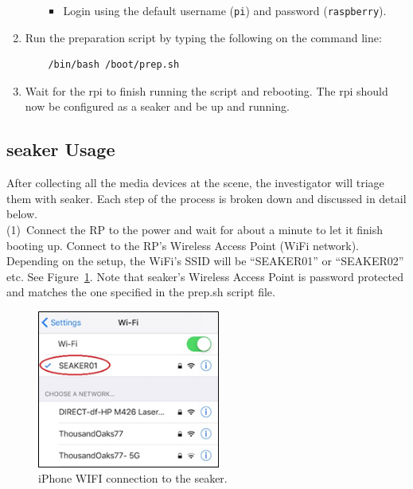 \documentclass[12pt]{article}
\begin{document}
\begin{enumerate}
\begin{itemize}
\begin{itemize}
        \item Login using the default username (\verb|pi|) and password
        (\verb|raspberry|).
      \end{itemize}
    \end{itemize}
  \item Run the preparation script by typing the following on the command line:
  \begin{verbatim}
    /bin/bash /boot/prep.sh
  \end{verbatim}
  \item Wait for the \gls{rpi} to finish running the script and
  rebooting. The \gls{rpi} should now be configured as a \gls{seaker}
  and be up and running.
\end{enumerate}

\newpage
\subsection{\gls{seaker} Usage}

After collecting all the media devices at the scene, the investigator
will triage them with \gls{seaker}.  Each step of the process is broken
down and discussed in detail below.\\

(1)~Connect the RP to the power and wait for about a minute
to let it finish booting up.
Connect to the RP's Wireless Access Point (WiFi network). Depending
on the setup, the WiFi's SSID will be ``SEAKER01'' or ``SEAKER02''
etc.  See Figure~\ref{fig:screen-1}. Note that \gls{seaker}'s Wireless Access
Point is password
protected and matches the one specified in the prep.sh script file.\\

\begin{figure}[ht]
  \begin{center}
  \includegraphics[width=6cm]{images/seaker-hh-screen-1.jpg}
  \caption{iPhone WIFI connection to the \gls{seaker}.}\label{fig:screen-1}
  \end{center}
\end{figure}
\end{document}
